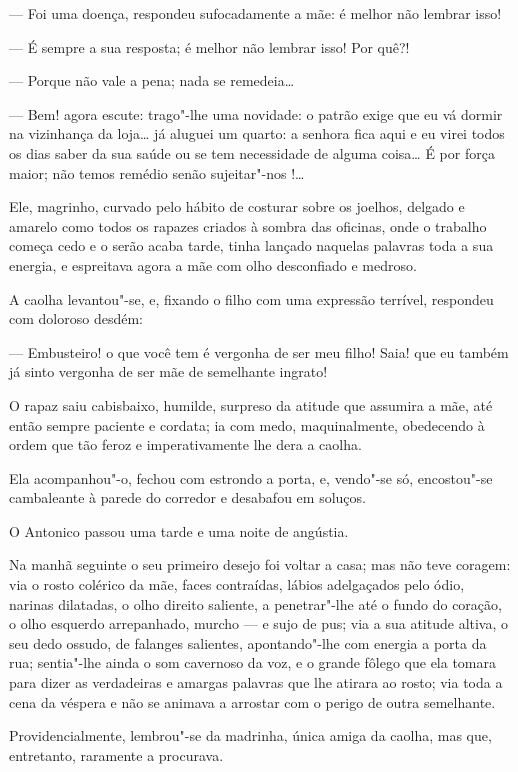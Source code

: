 --- Foi uma doença, respondeu sufocadamente a mãe: é melhor não lembrar
isso!

--- É sempre a sua resposta; é melhor não lembrar isso! Por quê?!

--- Porque não vale a pena; nada se remedeia\ldots{}

--- Bem! agora escute: trago"-lhe uma novidade: o patrão exige que eu vá
dormir na vizinhança da loja\ldots{} já aluguei um quarto: a senhora fica
aqui e eu virei todos os dias saber da sua saúde ou se tem necessidade
de alguma coisa\ldots{} É por força maior; não temos remédio senão
sujeitar"-nos !\ldots{}

Ele, magrinho, curvado pelo hábito de costurar sobre os joelhos, delgado
e amarelo como todos os rapazes criados à sombra das oficinas, onde o
trabalho começa cedo e o serão acaba tarde, tinha lançado naquelas
palavras toda a sua energia, e espreitava agora a mãe com olho
desconfiado e medroso.

A caolha levantou"-se, e, fixando o filho com uma expressão terrível,
respondeu com doloroso desdém:

--- Embusteiro! o que você tem é vergonha de ser meu filho! Saia! que eu
também já sinto vergonha de ser mãe de semelhante ingrato!

O rapaz saiu cabisbaixo, humilde, surpreso da atitude que assumira a
mãe, até então sempre paciente e cordata; ia com medo, maquinalmente,
obedecendo à ordem que tão feroz e imperativamente lhe dera a caolha.

Ela acompanhou"-o, fechou com estrondo a porta, e, vendo"-se só,
encostou"-se cambaleante à parede do corredor e desabafou em soluços.

O Antonico passou uma tarde e uma noite de angústia.

Na manhã seguinte o seu primeiro desejo foi voltar a casa; mas não teve
coragem: via o rosto colérico da mãe, faces contraídas, lábios
adelgaçados pelo ódio, narinas dilatadas, o olho direito saliente, a
penetrar"-lhe até o fundo do coração, o olho esquerdo arrepanhado, murcho
--- e sujo de pus; via a sua atitude altiva, o seu dedo ossudo, de
falanges salientes, apontando"-lhe com energia a porta da rua; sentia"-lhe
ainda o som cavernoso da voz, e o grande fôlego que ela tomara para
dizer as verdadeiras e amargas palavras que lhe atirara ao rosto; via
toda a cena da véspera e não se animava a arrostar com o perigo de outra
semelhante.

Providencialmente, lembrou"-se da madrinha, única amiga da caolha, mas
que, entretanto, raramente a procurava.


